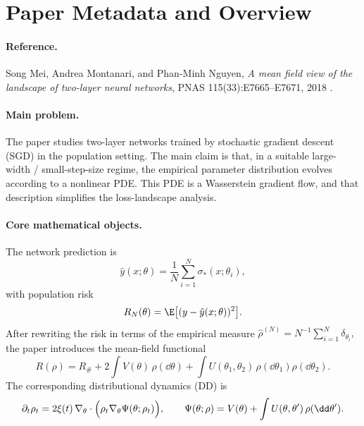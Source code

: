\section{Paper Metadata and Overview}

\paragraph{Reference.}
Song Mei, Andrea Montanari, and Phan-Minh Nguyen,
\emph{A mean field view of the landscape of two-layer neural networks},
PNAS 115(33):E7665--E7671, 2018 \cite{mei2018meanfield}.

\paragraph{Main problem.}
The paper studies two-layer networks trained by stochastic gradient descent (SGD) in the population setting. The main claim is that, in a suitable large-width / small-step-size regime, the empirical parameter distribution evolves according to a nonlinear PDE. This PDE is a Wasserstein gradient flow, and that description simplifies the loss-landscape analysis.

\paragraph{Core mathematical objects.}
The network prediction is
\begin{equation}
\hat y(x;\theta)=\frac{1}{N}\sum_{i=1}^N \sigma_*(x;\theta_i),
\end{equation}
with population risk
\begin{equation}
R_N(\theta)=\E\bigl[(y-\hat y(x;\theta))^2\bigr].
\end{equation}
After rewriting the risk in terms of the empirical measure
\(
\hat \rho^{(N)} = N^{-1}\sum_{i=1}^N \delta_{\theta_i},
\)
the paper introduces the mean-field functional
\begin{equation}
R(\rho)=R_\# + 2\int V(\theta)\,\rho(\dd \theta)
+ \int U(\theta_1,\theta_2)\,\rho(\dd\theta_1)\rho(\dd\theta_2).
\end{equation}
The corresponding distributional dynamics (DD) is
\begin{equation}
\partial_t \rho_t = 2\xi(t)\,\nabla_\theta \cdot \Bigl(\rho_t \nabla_\theta \Psi(\theta;\rho_t)\Bigr),
\qquad
\Psi(\theta;\rho)=V(\theta)+\int U(\theta,\theta')\,\rho(\dd\theta').
\end{equation}

